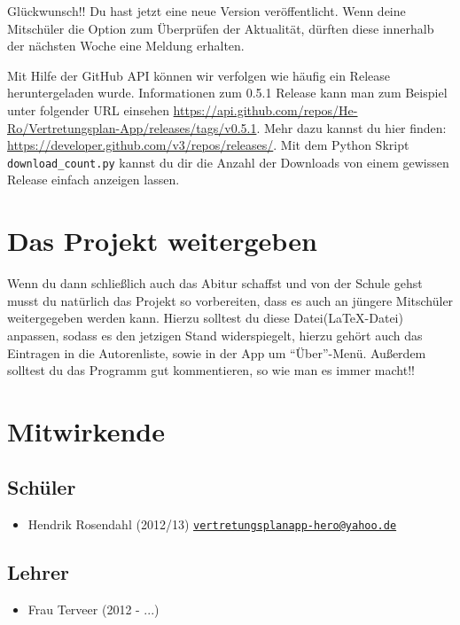 \documentclass[12pt,headsepline]{scrartcl}
\begin{document}
Glückwunsch!! Du hast jetzt eine neue Version veröffentlicht. Wenn deine Mitschüler die Option zum Überprüfen der Aktualität, dürften diese innerhalb der nächsten Woche eine Meldung erhalten.
 
Mit Hilfe der GitHub API können wir verfolgen wie häufig ein Release heruntergeladen wurde.
Informationen zum 0.5.1 Release kann man zum Beispiel unter folgender URL einsehen \url{https://api.github.com/repos/He-Ro/Vertretungsplan-App/releases/tags/v0.5.1}.
Mehr dazu kannst du hier finden: \url{https://developer.github.com/v3/repos/releases/}.
Mit dem Python Skript \texttt{download\_count.py} kannst du dir die Anzahl der Downloads von einem gewissen Release einfach anzeigen lassen.

\section{Das Projekt weitergeben}
Wenn du dann schließlich auch das Abitur schaffst und von der Schule gehst musst du natürlich das Projekt so vorbereiten, dass es auch an jüngere Mitschüler weitergegeben werden kann. Hierzu solltest du diese Datei(\LaTeX-Datei) anpassen, sodass es den jetzigen Stand widerspiegelt, hierzu gehört auch das Eintragen in die Autorenliste, sowie in der App um ``Über''-Menü. Außerdem solltest du das Programm gut kommentieren, so wie man es immer macht!!

\section{Mitwirkende}
\subsection{Schüler}
\begin{itemize}
 \item Hendrik Rosendahl (2012/13) \href{mailto:vertretungsplanapp-hero@yahoo.de?subject=Vertretungsplan-App}{\texttt{vertretungsplanapp-hero@yahoo.de}}
\end{itemize}
\subsection{Lehrer}
\begin{itemize}
 \item Frau Terveer (2012 - ...)
\end{itemize}
\end{document}
